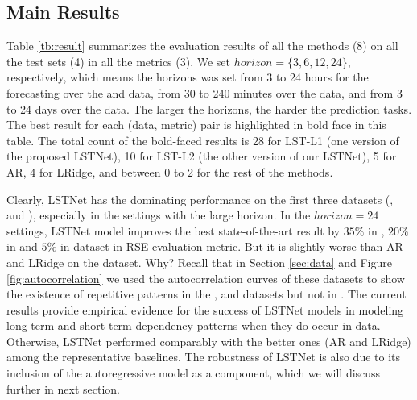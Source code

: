 \subsection{Main Results}
\label{sec:result}


Table \ref{tb:result} summarizes the evaluation results of all the methods (8) on all the test sets (4) in all the metrics (3). We set $horizon = \{3,6,12,24\}$, respectively, which means the horizons was set from 3 to 24 hours for the forecasting over the \electricity and \traffic data, from 30 to 240 minutes over the \solar data, and from 3 to 24 days over the \exchange data. The larger the horizons, the harder the prediction tasks. The best result for each (data, metric) pair is highlighted in bold face in this table.  The total count of the bold-faced results is 28 for LST-L1 (one version of the proposed LSTNet), 10 for LST-L2 (the other version of our LSTNet), 5 for AR, 4 for LRidge, and between 0 to 2 for the rest of the methods.  

Clearly, LSTNet has the dominating performance on the first three datasets (\electricity, \solar and \traffic), especially in the settings with the large horizon. In the $horizon=24$ settings, LSTNet model improves the best state-of-the-art result by $35\%$ in \solar, $20\%$ in \traffic and $5\%$ in \electricity dataset in RSE evaluation metric. But it is slightly worse than AR and LRidge on the \exchange dataset. Why?  Recall that in Section \ref{sec:data} and Figure  \ref{fig:autocorrelation} we used the autocorrelation curves of these datasets to show the existence of  repetitive patterns in the \solar, \traffic and \electricity datasets but not in \exchange.  The current results provide empirical evidence for the success of LSTNet models in modeling long-term and short-term dependency patterns when they do occur in data.  Otherwise, LSTNet performed comparably  with the better ones (AR and LRidge) among the representative baselines.  The robustness of LSTNet is also due to its inclusion of the autoregressive model as a component, which we will discuss further in next section.


